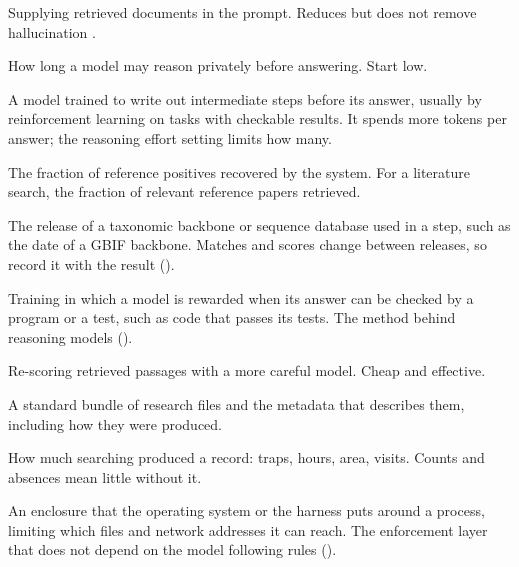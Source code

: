 \begin{description}[itemsep=0.2em]
\item[RAG (Retrieval-Augmented Generation)] Supplying retrieved documents in the
  prompt. Reduces but does not remove hallucination
  \parencite{kurniawan2024ragfailures}.

\item[Reasoning effort] How long a model may reason privately before answering.
  Start low.

\item[Reasoning model] A model trained to write out intermediate steps before
  its answer, usually by reinforcement learning on tasks with checkable
  results. It spends more tokens per answer; the reasoning effort setting
  limits how many.

\item[Recall] The fraction of reference positives recovered by the system.
  For a literature search, the fraction of relevant reference papers retrieved.

\item[Reference-database version] The release of a taxonomic backbone or
  sequence database used in a step, such as the date of a GBIF backbone.
  Matches and scores change between releases, so record it with the result
  ().

\item[Reinforcement learning on verifiable tasks] Training in which a model is
  rewarded when its answer can be checked by a program or a test, such as
  code that passes its tests. The method behind reasoning models
  ().

\item[Reranking] Re-scoring retrieved passages with a more careful model. Cheap
  and effective.

\item[RO-Crate] A standard bundle of research files and the metadata that
  describes them, including how they were produced.

\item[Sampling effort] How much searching produced a record: traps, hours,
  area, visits. Counts and absences mean little without it.

\item[Sandbox] An enclosure that the operating system or the harness puts
  around a process, limiting which files and network addresses it can reach.
  The enforcement layer that does not depend on the model following rules
  \parencite{anthropic2025sandboxing} ().


\end{description}
